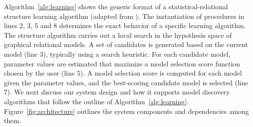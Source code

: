 Algorithm~\ref{alg:learning} shows the generic format of a statistical-relational structure learning algorithm (adapted from 
\cite{Kimmig2015}%
). The instantiation of procedures in lines 2, 3, 5 and 8 determines the exact behavior of a specific learning algorithm. The structure algorithm carries out a local search in the hypothesis space of graphical relational models. A set of candidates is generated based on the current model (line 3), typically using a search heuristic. For each candidate model, parameter values are estimated that maximize a model selection score function chosen by the  user (line 5). A model selection score is computed for each model given the parameter values, and the best-scoring candidate model is selected (line 7). 
We next discuss our system design and how it supports model discovery algorithms that follow the outline of Algorithm~\ref{alg:learning}. Figure~\ref{fig:architecture} outlines the system components and dependencies among them.

%
%
%

